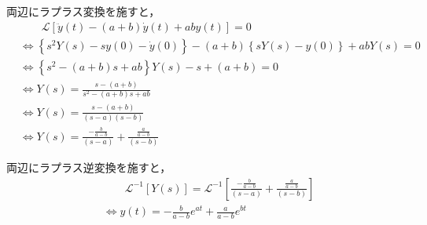 \documentclass[a4paper,12pt]{article}
\begin{document}
\begin{tcolorbox}[title={2. \( \ddot{y}(t) - (a+b)\dot{y}(t) + aby(t) = 0\)を解け。ただし、\(y(0)=1,\dot{y}(0)=0\)とする。
    }]
  \quad 両辺にラプラス変換を施すと，
        \vspace{-3mm}
        \begin{align*}
            &\qquad \mathcal{L}\left[ \ddot{y}(t) - ( a + b )\dot{y}(t)  + a b y(t) \right] = 0 \\
            &\Leftrightarrow \left\{ s^2 Y(s) - sy(0) - \dot{y}(0) \right\}
            - (a+b)\left\{ sY(s) - y(0) \right\}
            + abY(s) = 0  \\
            &\Leftrightarrow \left\{ s^2 - (a + b) s + ab\right\} Y(s) - s + ( a + b )= 0  \\
            &\Leftrightarrow Y(s) = \frac{s - (a + b)}{ s^2 - (a + b) s + ab }  \\
            &\Leftrightarrow Y(s) =  \frac{s - (a + b)}{ (s - a)(s - b) }  \\
            &\Leftrightarrow Y(s) =  \frac{- \frac{b}{a-b}}{ (s - a) } + \frac{ \frac{a}{a-b}}{ (s - b) }
        \end{align*}
            
        \quad 両辺にラプラス逆変換を施すと，
        \vspace{-3mm}
        \begin{align*}
        &\qquad \mathcal{L}^{-1} \left[ Y(s) \right] 
        = \mathcal{L}^{-1} \left[ \frac{- \frac{b}{a-b}}{ (s - a) } + \frac{ \frac{a}{a-b}}{ (s - b) }  \right] \\
        &\Leftrightarrow y(t) = - \frac{b}{a-b}e^{at} + \frac{a}{a-b}e^{bt}
        \end{align*}
\end{tcolorbox}
\end{document}
